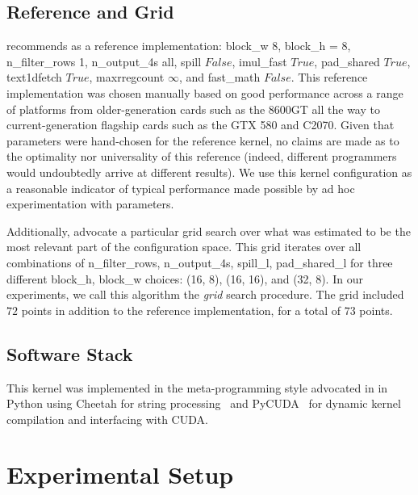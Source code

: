 \documentclass{sig-alternate}
\begin{document}
\subsection{Reference and Grid}
\label{sec:refgrid}

\cite{pinto+cox:2011gcg} recommends as a reference implementation: block\_w 8, 
block\_h = 8, n\_filter\_rows 1, n\_output\_4s all, spill $False$, imul\_fast $True$,
pad\_shared $True$, 
text1dfetch $True$,
maxrregcount $\infty$,
and fast\_math $False$.
This reference implementation was chosen manually based on good performance across a range of platforms from older-generation
cards such as the
8600GT all the way to
current-generation flagship cards such as the GTX 580 and C2070.
Given that parameters were hand-chosen for the reference kernel, no claims are
made as to the optimality nor universality of this reference (indeed, different
programmers would undoubtedly arrive at different results).  We use this
kernel configuration as a reasonable indicator of typical performance
made possible by ad hoc experimentation with parameters.

Additionally, \cite{pinto+cox:2011gcg} advocate a particular grid search over
what was estimated to be the most relevant part of the configuration space.
This grid iterates over all
combinations of n\_filter\_rows, n\_output\_4s, spill\_l, pad\_shared\_l for three different block\_h, block\_w choices: (16, 8), (16, 16), and (32, 8).
In our experiments, we call this algorithm the {\em grid} search procedure.
The grid included $72$ points in addition to the reference implementation, for a total of $73$ points.

\subsection{Software Stack}

This kernel was implemented in the meta-programming style advocated in
\citet{pinto+cox:2011gcg} in Python using Cheetah for string
processing~\citep{cheetah} and PyCUDA~\citep{klockner2011pycuda} for dynamic
kernel compilation and interfacing with CUDA.


\section{Experimental Setup}
\end{document}
